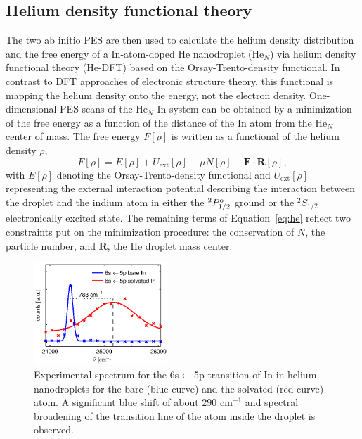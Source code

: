 \documentclass[twoside,twocolumn,9pt]{article}
\begin{document}
\subsection{Helium density functional theory}
The two ab initio PES are then used to calculate the helium density distribution and the free energy of a In-atom-doped He nanodroplet (He$_N$) via helium density functional theory (He-DFT) based on the Orsay-Trento-density functional.\cite{Dalfovo:1995gf} In contrast to DFT approaches of electronic structure theory, this functional is mapping the helium density onto the energy, not the electron density. One-dimensional PES scans of the He$_{N}$-In system can be obtained by a minimization of the free energy as a function of the distance of the In atom from the He$_{N}$ center of mass. The free energy $F[\rho]$ is written as a functional of the helium density $\rho$,
\begin{equation}
  \label{eq:he}
  F[\rho{}] = E[\rho] + U_{\mathrm{ext}}[\rho] - \mu{}N[\rho] - \mathbf{F}\cdot{}\mathbf{R}
[\rho], 
\end{equation}
with $E[\rho]$ denoting the Orsay-Trento-density functional and $U_{\mathrm{ext}}[\rho]$  representing the external interaction potential describing the interaction between the droplet and the indium atom in either the $^2P^{\rm o}_{1/2}$ ground or the $^2S_{1/2}$ electronically excited state. The remaining terms of Equation~\ref{eq:he} reflect two constraints put on the minimization procedure: the conservation of $N$, the particle number, and $\mathbf{R}$, the He droplet mass center.


\begin{figure}[htbp!]
  	\begin{center}
 		\includegraphics[width=0.45\textwidth]{1.eps}
                \caption{Experimental spectrum for the 6s$\leftarrow{}$5p  transition of In in helium nanodroplets for the bare (blue curve) and the solvated (red curve) atom. A significant blue shift of about 290 cm$^{-1}$ and spectral broadening of the transition line of the atom inside the droplet is observed. \label{pic:exp}}
  	\end{center}
\end{figure}
\end{document}
